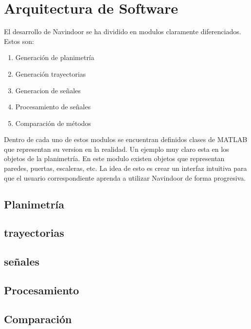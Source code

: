 \section{Arquitectura de Software}

El desarrollo de Navindoor se ha dividido en modulos claramente diferenciados. Estos son:
\begin{enumerate}
    \item Generación de planimetría 
    \item Generación trayectorias
    \item Generacion de señales
    \item Procesamiento de señales
    \item Comparación de métodos
\end{enumerate}

Dentro de cada uno de estos modulos se encuentran definidos clases de MATLAB que representan su version en la realidad. Un ejemplo muy claro esta en los objetos de la planimetría. En este modulo existen objetos que representan paredes, puertas, escaleras, etc. La idea de esto es crear un interfaz intuitiva para que el usuario correspondiente aprenda a utilizar Navindoor de forma progresiva.

\subsection{Planimetría}
\subsection{trayectorias}
\subsection{señales}
\subsection{Procesamiento}
\subsection{Comparación}